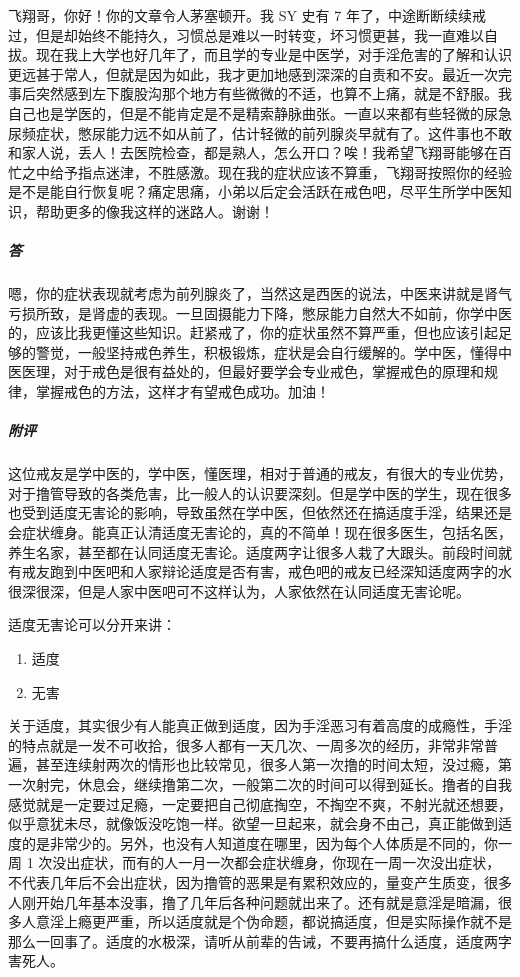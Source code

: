 \begin{case}
    飞翔哥，你好！你的文章令人茅塞顿开。我 SY 史有 7 年了，中途断断续续戒过，但是却始终不能持久，习惯总是难以一时转变，坏习惯更甚，我一直难以自拔。现在我上大学也好几年了，而且学的专业是中医学，对手淫危害的了解和认识更远甚于常人，但就是因为如此，我才更加地感到深深的自责和不安。最近一次完事后突然感到左下腹股沟那个地方有些微微的不适，也算不上痛，就是不舒服。我自己也是学医的，但是不能肯定是不是精索静脉曲张。一直以来都有些轻微的尿急尿频症状，憋尿能力远不如从前了，估计轻微的前列腺炎早就有了。这件事也不敢和家人说，丢人！去医院检查，都是熟人，怎么开口？唉！我希望飞翔哥能够在百忙之中给予指点迷津，不胜感激。现在我的症状应该不算重，飞翔哥按照你的经验是不是能自行恢复呢？痛定思痛，小弟以后定会活跃在戒色吧，尽平生所学中医知识，帮助更多的像我这样的迷路人。谢谢！
    \subparagraph{答} 嗯，你的症状表现就考虑为前列腺炎了，当然这是西医的说法，中医来讲就是肾气亏损所致，是肾虚的表现。一旦固摄能力下降，憋尿能力自然大不如前，你学中医的，应该比我更懂这些知识。赶紧戒了，你的症状虽然不算严重，但也应该引起足够的警觉，一般坚持戒色养生，积极锻炼，症状是会自行缓解的。学中医，懂得中医医理，对于戒色是很有益处的，但最好要学会专业戒色，掌握戒色的原理和规律，掌握戒色的方法，这样才有望戒色成功。加油！
    \subparagraph{附评} 这位戒友是学中医的，学中医，懂医理，相对于普通的戒友，有很大的专业优势，对于撸管导致的各类危害，比一般人的认识要深刻。但是学中医的学生，现在很多也受到适度无害论的影响，导致虽然在学中医，但依然还在搞适度手淫，结果还是会症状缠身。能真正认清适度无害论的，真的不简单！现在很多医生，包括名医，养生名家，甚至都在认同适度无害论。适度两字让很多人栽了大跟头。前段时间就有戒友跑到中医吧和人家辩论适度是否有害，戒色吧的戒友已经深知适度两字的水很深很深，但是人家中医吧可不这样认为，人家依然在认同适度无害论呢。

    适度无害论可以分开来讲：

    \begin{multicols}{2}
        \begin{enumerate}
            \item 适度
            \item 无害
        \end{enumerate}
    \end{multicols}

    关于适度，其实很少有人能真正做到适度，因为手淫恶习有着高度的成瘾性，手淫的特点就是一发不可收拾，很多人都有一天几次、一周多次的经历，非常非常普遍，甚至连续射两次的情形也比较常见，很多人第一次撸的时间太短，没过瘾，第一次射完，休息会，继续撸第二次，一般第二次的时间可以得到延长。撸者的自我感觉就是一定要过足瘾，一定要把自己彻底掏空，不掏空不爽，不射光就还想要，似乎意犹未尽，就像饭没吃饱一样。欲望一旦起来，就会身不由己，真正能做到适度的是非常少的。另外，也没有人知道度在哪里，因为每个人体质是不同的，你一周 1 次没出症状，而有的人一月一次都会症状缠身，你现在一周一次没出症状，不代表几年后不会出症状，因为撸管的恶果是有累积效应的，量变产生质变，很多人刚开始几年基本没事，撸了几年后各种问题就出来了。还有就是意淫是暗漏，很多人意淫上瘾更严重，所以适度就是个伪命题，都说搞适度，但是实际操作就不是那么一回事了。适度的水极深，请听从前辈的告诫，不要再搞什么适度，适度两字害死人。


\end{case}

